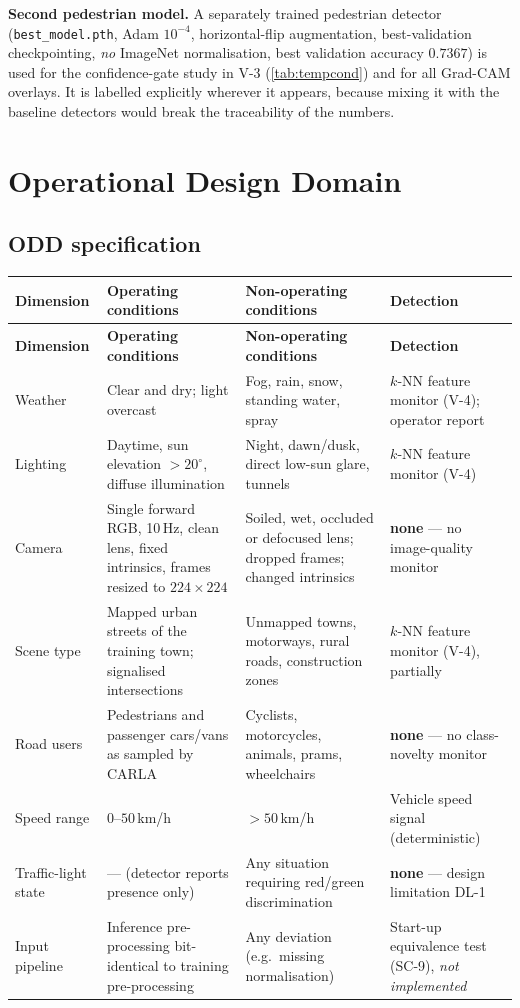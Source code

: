\documentclass[a4paper,12pt]{article}
\begin{document}
\noindent\textbf{Second pedestrian model.} A separately trained pedestrian detector
(\texttt{best\_model.pth}, Adam $10^{-4}$, horizontal-flip augmentation, best-validation
checkpointing, \emph{no} ImageNet normalisation, best validation accuracy $0.7367$) is
used for the confidence-gate study in V-3 (\cref{tab:tempcond}) and for all Grad-CAM
overlays. It is labelled explicitly wherever it appears, because mixing it with the
baseline detectors would break the traceability of the numbers.



\section{Operational Design Domain}
\label{sec:odd}

\subsection{ODD specification}

{\scriptsize
\begin{longtable}{@{}P{2.0cm}P{4.9cm}P{4.9cm}P{2.9cm}@{}}
\toprule
\textbf{Dimension} & \textbf{Operating conditions} & \textbf{Non-operating conditions} & \textbf{Detection} \\
\midrule
\endfirsthead
\toprule
\textbf{Dimension} & \textbf{Operating conditions} & \textbf{Non-operating conditions} & \textbf{Detection} \\
\midrule
\endhead
\bottomrule
\endlastfoot
Weather
  & Clear and dry; light overcast
  & Fog, rain, snow, standing water, spray
  & $k$-NN feature monitor (V-4); operator report \\
Lighting
  & Daytime, sun elevation $>20^\circ$, diffuse illumination
  & Night, dawn/dusk, direct low-sun glare, tunnels
  & $k$-NN feature monitor (V-4) \\
Camera
  & Single forward RGB, 10\,Hz, clean lens, fixed intrinsics, frames resized to
    $224\times224$
  & Soiled, wet, occluded or defocused lens; dropped frames; changed intrinsics
  & \textbf{none} --- no image-quality monitor \\
Scene type
  & Mapped urban streets of the training town; signalised intersections
  & Unmapped towns, motorways, rural roads, construction zones
  & $k$-NN feature monitor (V-4), partially \\
Road users
  & Pedestrians and passenger cars/vans as sampled by CARLA
  & Cyclists, motorcycles, animals, prams, wheelchairs
  & \textbf{none} --- no class-novelty monitor \\
Speed range
  & $0$--$50$\,km/h
  & $>50$\,km/h
  & Vehicle speed signal (deterministic) \\
Traffic-light state
  & --- (detector reports presence only)
  & Any situation requiring red/green discrimination
  & \textbf{none} --- design limitation DL-1 \\
Input pipeline
  & Inference pre-processing bit-identical to training pre-processing
  & Any deviation (e.g.\ missing normalisation)
  & Start-up equivalence test (SC-9), \emph{not implemented} \\
\end{longtable}}
\end{document}
